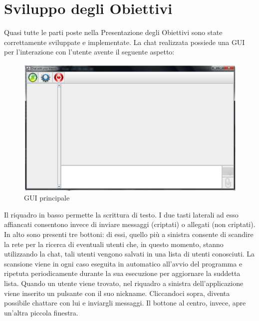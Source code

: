 \section{Sviluppo degli Obiettivi}
Quasi tutte le parti poste nella Presentazione degli Obiettivi sono state correttamente
sviluppate e implementate. La chat realizzata possiede una GUI per l'interazione
con l'utente avente il seguente aspetto:
\begin{figure}[h]
\centering
\includegraphics[scale=0.4]{gui1.jpg}
\caption{GUI principale\label{fig:gui}}
\end{figure}

Il riquadro in basso permette la scrittura di testo.
I due tasti laterali ad esso affiancati
consentono invece di inviare messaggi (criptati) o allegati (non criptati).
In alto sono presenti tre bottoni:
di essi, quello più a sinistra consente di scandire la rete per la ricerca di eventuali 
utenti che, in questo momento, stanno utilizzando la chat, tali utenti vengono salvati
in una lista di utenti conosciuti.
La scansione viene in ogni caso eseguita in automatico all'avvio del programma
e ripetuta periodicamente durante la sua esecuzione per aggiornare la suddetta lista.
Quando un utente viene trovato, nel riquadro a sinistra 
dell'applicazione viene inserito un pulsante con il suo nickname.
Cliccandoci sopra, diventa possibile chattare con lui e inviargli messaggi.
Il bottone al centro, invece, apre un'altra piccola finestra.

